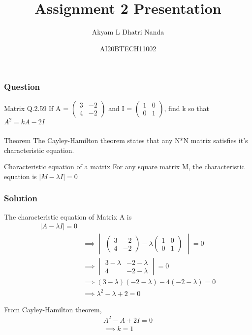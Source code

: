 \documentclass{beamer}
\title{Assignment 2 Presentation}
\author{Akyam L Dhatri Nanda}
\date{AI20BTECH11002}
\newcommand{\myvec}[1]{\ensuremath{\begin{pmatrix}#1\end{pmatrix}}}
\newcommand{\mydet}[1]{\ensuremath{\begin{vmatrix}#1\end{vmatrix}}}
\providecommand{\brak}[1]{\ensuremath{\left(#1\right)}}
\begin{document}
\begin{frame}
\titlepage
\end{frame}

\begin{frame}
\frametitle{Question}
\begin{block}{Matrix Q.2.59}
If A = $\myvec{3 & -2 \\ 4 & -2}$ and I = $\myvec{1 & 0 \\ 0 & 1}$, find k so that $A^2 = kA -2I$
\end{block}
\end{frame}

\begin{frame}
\frametitle{}
\begin{block}{Theorem}
The Cayley-Hamilton theorem states that any N*N matrix satisfies it's characteristic equation.
\end{block}

\begin{block}{Characteristic equation of a matrix}
For any square matrix M, the characteristic equation is $|{M - \lambda I}| = 0$
\end{block}
\end{frame}
\begin{frame}
\frametitle{Solution}
The characteristic equation of Matrix A is 
\begin{align}
    |{A - \lambda I}| = 0\label{eq 2.0.1}\\
    & \implies \mydet{\myvec{3 & -2 \\ 4 & -2} - \lambda\myvec{1 & 0 \\ 0 & 1}} = 0\\
    & \implies \mydet{3 - \lambda & -2 - \lambda \\ 4 & -2-\lambda} = 0\\
    & \implies \brak{3-\lambda}\brak{-2-\lambda} - 4\brak{-2-\lambda} = 0\\
    & \implies \lambda^2 -\lambda +2 = 0 \label{eq 2.0.5}
\end{align}

From Cayley-Hamilton theorem, 
\begin{align}
    A^2 - A +2I = 0\\
    \implies k=1
\end{align}

\end{frame}
\end{document}
